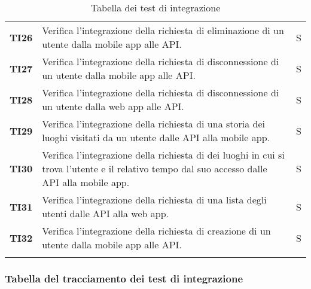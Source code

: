 \documentclass[../../piano-di-qualifica.tex]{subfiles}
\begin{document}
\begin{longtable}[H]{>{\centering\bfseries}m{3cm} >{}m{10cm} >{\centering\arraybackslash}m{3cm}}
  TI26               & Verifica l'integrazione della richiesta di eliminazione di un utente dalla mobile app alle API\@.                                             & S                             \\

  TI27               & Verifica l'integrazione della richiesta di disconnessione di un utente dalla mobile app alle API\@.                                           & S                             \\

  TI28               & Verifica l'integrazione della richiesta di disconnessione di un utente dalla web app alle API\@.                                              & S                             \\

  TI29               & Verifica l'integrazione della richiesta di una storia dei luoghi visitati da un utente dalle API alla mobile app.                             & S                             \\

  TI30               & Verifica l'integrazione della richiesta di dei luoghi in cui si trova l'utente e il relativo tempo dal suo accesso dalle API alla mobile app. & S                             \\

  TI31               & Verifica l'integrazione della richiesta di una lista degli utenti dalle API alla web app.                                                     & S                             \\

  TI32               & Verifica l'integrazione della richiesta di creazione di un utente dalla mobile app alle API\@.                                                & S                             \\

  \rowcolor{white}
  \caption{Tabella dei test di integrazione}%
  \label{tab:test_integrazione}
\end{longtable}

\subsubsection{Tabella del tracciamento dei test di integrazione}%
\label{subsub:tabella_tracciamento_test_di_integrazione}
\end{document}
